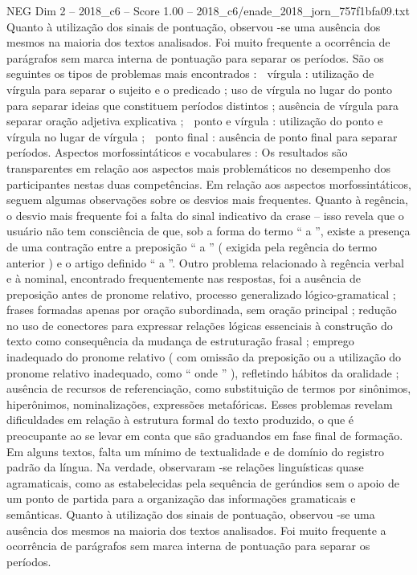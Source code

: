 \begin{textsample}{NEG Dim 2 – 2018\_c6 – Score 1.00 – 2018\_c6/enade\_2018\_jorn\_757f1bfa09.txt}
Quanto à utilização dos sinais de pontuação, observou -se uma ausência dos mesmos na maioria dos textos analisados.
Foi muito frequente a ocorrência de parágrafos sem marca interna de pontuação para separar os períodos.
São os seguintes os tipos de problemas mais encontrados :  vírgula : utilização de vírgula para separar o sujeito e o predicado ; uso de vírgula no lugar do ponto para separar ideias que constituem períodos distintos ; ausência de vírgula para separar oração adjetiva explicativa ;  ponto e vírgula : utilização do ponto e vírgula no lugar de vírgula ;  ponto final : ausência de ponto final para separar períodos.
Aspectos morfossintáticos e vocabulares : Os resultados são transparentes em relação aos aspectos mais problemáticos no desempenho dos participantes nestas duas competências.
Em relação aos aspectos morfossintáticos, seguem algumas observações sobre os desvios mais frequentes.
Quanto à regência, o desvio mais frequente foi a falta do sinal indicativo da crase – isso revela que o usuário não tem consciência de que, sob a forma do termo “ a ”, existe a presença de uma contração entre a preposição “ a ” ( exigida pela regência do termo anterior ) e o artigo definido “ a ”.
Outro problema relacionado à regência verbal e à nominal, encontrado frequentemente nas respostas, foi a ausência de preposição antes de pronome relativo, processo generalizado lógico-gramatical ; frases formadas apenas por oração subordinada, sem oração principal ; redução no uso de conectores para expressar relações lógicas essenciais à construção do texto como consequência da mudança de estruturação frasal ; emprego inadequado do pronome relativo ( com omissão da preposição ou a utilização do pronome relativo inadequado, como “ onde ” ), refletindo hábitos da oralidade ; ausência de recursos de referenciação, como substituição de termos por sinônimos, hiperônimos, nominalizações, expressões metafóricas.
Esses problemas revelam dificuldades em relação à estrutura formal do texto produzido, o que é preocupante ao se levar em conta que são graduandos em fase final de formação.
Em alguns textos, falta um mínimo de textualidade e de domínio do registro padrão da língua.
Na verdade, observaram -se relações linguísticas quase agramaticais, como as estabelecidas pela sequência de gerúndios sem o apoio de um ponto de partida para a organização das informações gramaticais e semânticas.
Quanto à utilização dos sinais de pontuação, observou -se uma ausência dos mesmos na maioria dos textos analisados.
Foi muito frequente a ocorrência de parágrafos sem marca interna de pontuação para separar os períodos.

\end{textsample}
